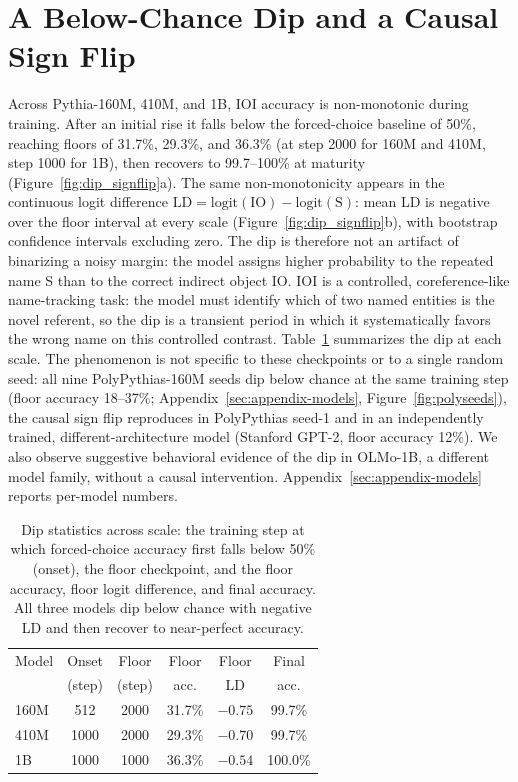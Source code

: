 \documentclass[11pt]{article}
\begin{document}
\section{A Below-Chance Dip and a Causal Sign Flip}
\label{sec:spine}
Across Pythia-160M, 410M, and 1B, IOI accuracy is non-monotonic during
training. After an initial rise it falls below the forced-choice baseline of
50\%, reaching floors of 31.7\%, 29.3\%, and 36.3\% (at step 2000 for 160M and
410M, step 1000 for 1B), then recovers to 99.7--100\% at maturity
(Figure~\ref{fig:dip_signflip}a). The same non-monotonicity appears in the
continuous logit difference $\mathrm{LD}=\mathrm{logit}(\text{IO})-\mathrm{logit}(\text{S})$:
mean LD is negative over the floor interval at every scale
(Figure~\ref{fig:dip_signflip}b), with bootstrap confidence intervals excluding
zero. The dip is therefore not an artifact of binarizing a noisy margin: the
model assigns higher probability to the repeated name S than to the correct
indirect object IO. IOI is a controlled, coreference-like name-tracking task:
the model must identify which of two named entities is the novel referent, so the
dip is a transient period in which it systematically favors the wrong name on this
controlled contrast. Table~\ref{tab:dipstats} summarizes the dip at each scale.
The phenomenon is not specific to these checkpoints or to a single random seed:
all nine PolyPythias-160M seeds dip below chance at the same training step
(floor accuracy 18--37\%; Appendix~\ref{sec:appendix-models},
Figure~\ref{fig:polyseeds}), the causal sign flip reproduces in PolyPythias
seed-1 and in an independently trained, different-architecture model (Stanford
GPT-2, floor accuracy 12\%). We also observe suggestive behavioral evidence of
the dip in OLMo-1B, a different model family, without a causal intervention.
Appendix~\ref{sec:appendix-models} reports per-model numbers.

\begin{table}[t]
  \centering\small
  \setlength{\tabcolsep}{4pt}
  \begin{tabular}{lccccc}
    \toprule
    Model & Onset & Floor & Floor & Floor & Final \\
          & (step) & (step) & acc. & LD & acc. \\
    \midrule
    160M & 512  & 2000 & 31.7\% & $-0.75$ & 99.7\% \\
    410M & 1000 & 2000 & 29.3\% & $-0.70$ & 99.7\% \\
    1B   & 1000 & 1000 & 36.3\% & $-0.54$ & 100.0\% \\
    \bottomrule
  \end{tabular}
  \caption{Dip statistics across scale: the training step at which forced-choice
  accuracy first falls below 50\% (onset), the floor checkpoint, and the floor
  accuracy, floor logit difference, and final accuracy. All three models dip
  below chance with negative LD and then recover to near-perfect accuracy.}
  \label{tab:dipstats}
\end{table}
\end{document}
